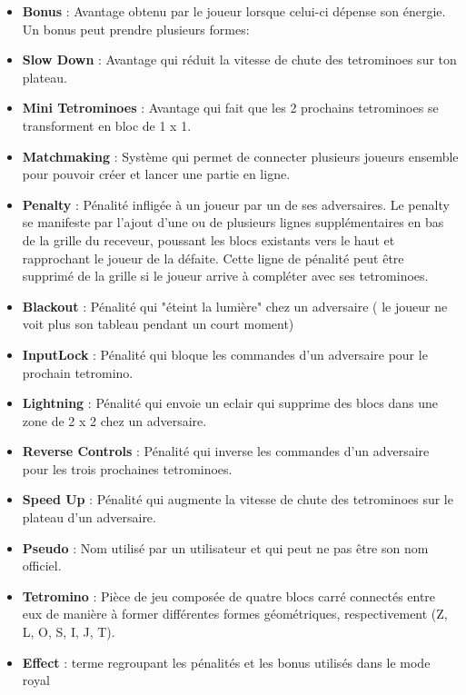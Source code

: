 \documentclass{article}
\begin{document}
\begin{itemize}

	\item \textbf{Bonus} : Avantage obtenu par le joueur lorsque celui-ci dépense son énergie. Un bonus peut prendre plusieurs formes:

    \item \textbf{Slow Down} : Avantage qui réduit la vitesse de chute des tetrominoes sur ton plateau.

    \item \textbf{Mini Tetrominoes} : Avantage qui fait que les 2 prochains tetrominoes se transforment en bloc de 1 x 1.
    
	 \item \textbf{Matchmaking} : Système qui permet de connecter plusieurs joueurs ensemble pour pouvoir créer et lancer une partie en ligne.

	\item \textbf{Penalty} : Pénalité infligée à un joueur par un de ses adversaires. Le penalty se manifeste par l'ajout d'une ou de plusieurs lignes supplémentaires en bas de la grille du receveur, poussant les blocs existants vers le haut et rapprochant le joueur de la défaite. Cette ligne de pénalité peut être supprimé de la grille si le joueur arrive à compléter avec ses tetrominoes. 

    \item \textbf{Blackout} : Pénalité qui "éteint la lumière" chez un adversaire ( le joueur ne voit plus son tableau pendant un court moment)

    \item \textbf{InputLock} : Pénalité qui bloque les commandes d'un adversaire pour le prochain tetromino.

    \item \textbf{Lightning} : Pénalité qui envoie un eclair qui supprime des blocs dans une zone de 2 x 2 chez un adversaire.

    \item \textbf{Reverse Controls} : Pénalité qui inverse les commandes d'un adversaire pour les trois prochaines tetrominoes.

    \item \textbf{Speed Up} : Pénalité qui augmente la vitesse de chute des tetrominoes sur le plateau d'un adversaire.
    
	 \item \textbf{Pseudo} : Nom utilisé par un utilisateur et qui peut ne pas être son nom officiel.
	
	\item \textbf{Tetromino} : Pièce de jeu composée de quatre blocs carré connectés entre eux de manière à former différentes formes géométriques, respectivement (Z, L, O, S, I, J, T). 
	
	\item \textbf{Effect} : terme regroupant les pénalités et les bonus utilisés dans le mode royal

\end{itemize}
\end{document}

